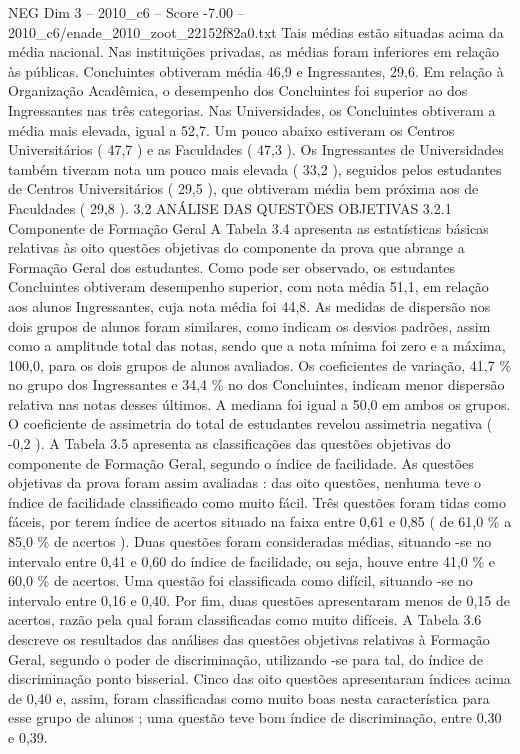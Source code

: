 \begin{textsample}{NEG Dim 3 – 2010\_c6 – Score -7.00 – 2010\_c6/enade\_2010\_zoot\_22152f82a0.txt}
Tais médias estão situadas acima da média nacional.
Nas instituições privadas, as médias foram inferiores em relação às públicas.
Concluintes obtiveram média 46,9 e Ingressantes, 29,6.
Em relação à Organização Acadêmica, o desempenho dos Concluintes foi superior ao dos Ingressantes nas três categorias.
Nas Universidades, os Concluintes obtiveram a média mais elevada, igual a 52,7.
Um pouco abaixo estiveram os Centros Universitários ( 47,7 ) e as Faculdades ( 47,3 ).
Os Ingressantes de Universidades também tiveram nota um pouco mais elevada ( 33,2 ), seguidos pelos estudantes de Centros Universitários ( 29,5 ), que obtiveram média bem próxima aos de Faculdades ( 29,8 ). 3.2 ANÁLISE DAS QUESTÕES OBJETIVAS 3.2.1 Componente de Formação Geral A Tabela 3.4 apresenta as estatísticas básicas relativas às oito questões objetivas do componente da prova que abrange a Formação Geral dos estudantes.
Como pode ser observado, os estudantes Concluintes obtiveram desempenho superior, com nota média 51,1, em relação aos alunos Ingressantes, cuja nota média foi 44,8.
As medidas de dispersão nos dois grupos de alunos foram similares, como indicam os desvios padrões, assim como a amplitude total das notas, sendo que a nota mínima foi zero e a máxima, 100,0, para os dois grupos de alunos avaliados.
Os coeficientes de variação, 41,7 \% no grupo dos Ingressantes e 34,4 \% no dos Concluintes, indicam menor dispersão relativa nas notas desses últimos.
A mediana foi igual a 50,0 em ambos os grupos.
O coeficiente de assimetria do total de estudantes revelou assimetria negativa ( -0,2 ).
A Tabela 3.5 apresenta as classificações das questões objetivas do componente de Formação Geral, segundo o índice de facilidade.
As questões objetivas da prova foram assim avaliadas : das oito questões, nenhuma teve o índice de facilidade classificado como muito fácil.
Três questões foram tidas como fáceis, por terem índice de acertos situado na faixa entre 0,61 e 0,85 ( de 61,0 \% a 85,0 \% de acertos ).
Duas questões foram consideradas médias, situando -se no intervalo entre 0,41 e 0,60 do índice de facilidade, ou seja, houve entre 41,0 \% e 60,0 \% de acertos.
Uma questão foi classificada como difícil, situando -se no intervalo entre 0,16 e 0,40.
Por fim, duas questões apresentaram menos de 0,15 de acertos, razão pela qual foram classificadas como muito difíceis.
A Tabela 3.6 descreve os resultados das análises das questões objetivas relativas à Formação Geral, segundo o poder de discriminação, utilizando -se para tal, do índice de discriminação ponto bisserial.
Cinco das oito questões apresentaram índices acima de 0,40 e, assim, foram classificadas como muito boas nesta característica para esse grupo de alunos ; uma questão teve bom índice de discriminação, entre 0,30 e 0,39.

\end{textsample}
